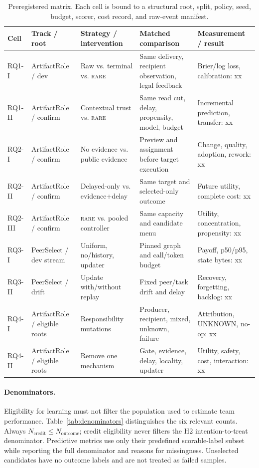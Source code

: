 \documentclass[sigconf,anonymous]{aamas}
\newcommand{\rare}{\textsc{rare}}
\begin{document}
\begin{table}[t]
\centering\small
\setlength{\tabcolsep}{2.6pt}
\begin{tabular}{p{}p{}p{}p{}p{}}
\toprule
Cell & Track / root & Strategy / intervention & Matched comparison & Measurement / result \\
\midrule
RQ1-I & ArtifactRole / dev & Raw vs. terminal vs. \rare{} & Same delivery, recipient observation, legal feedback & Brier/log loss, calibration: xx \\
RQ1-II & ArtifactRole / confirm & Contextual trust vs. \rare{} & Same read cut, delay, propensity, model, budget & Incremental prediction, transfer: xx \\
RQ2-I & ArtifactRole / confirm & No evidence vs. public evidence & Preview and assignment before target execution & Change, quality, adoption, rework: xx \\
RQ2-II & ArtifactRole / confirm & Delayed-only vs. evidence+delay & Same target and selected-only outcome & Future utility, complete cost: xx \\
RQ2-III & ArtifactRole / confirm & \rare{} vs. pooled controller & Same capacity and candidate menu & Utility, concentration, propensity: xx \\
RQ3-I & PeerSelect / dev stream & Uniform, no/history, updater & Pinned graph and call/token budget & Payoff, p50/p95, state bytes: xx \\
RQ3-II & PeerSelect / drift & Update with/without replay & Fixed peer/task drift and delay & Recovery, forgetting, backlog: xx \\
RQ4-I & ArtifactRole / eligible roots & Responsibility mutations & Producer, recipient, mixed, unknown, failure & Attribution, UNKNOWN, no-op: xx \\
RQ4-II & ArtifactRole / eligible roots & Remove one mechanism & Gate, evidence, delay, locality, updater & Utility, safety, cost, interaction: xx \\
\bottomrule
\end{tabular}
\caption{Preregistered matrix. Each cell is bound to a structural root, split, policy, seed, budget, scorer, cost record, and raw-event manifest.}
\label{tab:matrix}
\end{table}

\paragraph{Denominators.} Eligibility for learning must not filter the population used to estimate team performance. Table~\ref{tab:denominators} distinguishes the six relevant counts. Always $N_{\mathrm{credit}}\leq N_{\mathrm{outcome}}$; credit eligibility never filters the H2 intention-to-treat denominator. Predictive metrics use only their predefined scorable-label subset while reporting the full denominator and reasons for missingness. Unselected candidates have no outcome labels and are not treated as failed samples.
\end{document}
